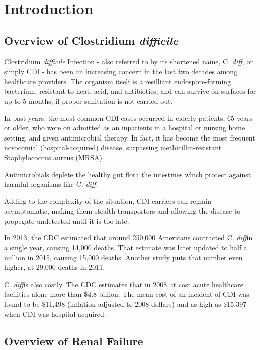 \documentclass[12pt]{ociamthesis}\usepackage[]{graphicx}\usepackage[]{color}
\newcommand{\cdifficile}{Clostridium \textit{difficile}}
\newcommand{\cdiff}{C. \textit{diff}}
\begin{document}
\chapter{Introduction}

\section{Overview of \cdifficile}

Clostridium \textit{difficile} Infection - also referred to by its shortened name, \cdiff, or simply CDI -
has been an increasing concern in the last two decades among healthcare providers. 
The organism itself is a resilliant endospore-forming bacterium, resistant to heat, acid, and antibiotics,
and can survive on surfaces for up to 5 months, if proper sanitation is not carried out. \cite{Gerding2008}

In past years, the most common CDI cases occurred in elderly patients, 65 years or older,
who were on admitted as an inpatients in a hospital or nursing home setting, and given antimicrobial therapy.
In fact, it has become the most frequent nosocomial (hospital-acquired) disease, surpassing
methicillin-resistant Staphylococcus aureus (MRSA). \cite{Gupta2014}

Antimicrobials deplete the healthy gut flora the intestines which protect against harmful organisms like \cdiff.

Adding to the complexity of the situation, CDI carriers can remain asymptomatic, making them stealth transporters
and allowing the disease to propegate undetected until it is too late. 

In 2013, the CDC estimated that around 250,000 Americans contracted \cdiff in a single year, causing 14,000 deaths.
That estimate was later updated to half a million in 2015, causing 15,000 deaths. \cite{CDC2018}
\cite{CDC2015} 
Another study puts that number even higher, at 29,000 deaths in 2011. 

\cdiff is also costly. The CDC estimates that in 2008, it cost acute healthcare facilities alone more than \$4.8 billion.
The mean cost of an incident of CDI was found to be \$11,498 (inflation adjusted to 2008 dollars)
and as high as \$15,397 when CDI was hospital acquired. \cite{Dubberke2012}


\section{Overview of Renal Failure}
\end{document}

